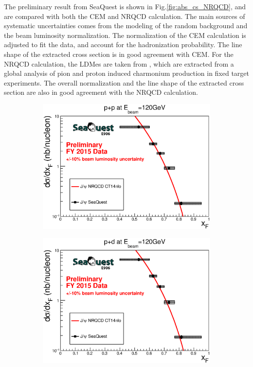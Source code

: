\documentclass[10pt, a4paper,final]{article}
\begin{document}
The preliminary result from SeaQuest is shown in Fig.\ref{fig:abs_cs_NRQCD},
and are compared with both the CEM and NRQCD calculation. The main sources
of systematic uncertainties comes from the modeling of the random background
and the beam luminosity normalization. The normalization of the CEM calculation is
adjusted to fit the data, and account for the hadronization probability. The line
shape of the extracted cross section is in good agreement with CEM. For the NRQCD
calculation, the LDMes are taken from \cite{hsieh2021}, which are extracted from
a global analysis of pion and proton induced charmonium production in fixed target
experiments. The overall normalization and the line shape of the extracted cross
section are also in good agreement with the NRQCD calculation.
\begin{figure}[htbp!]
	\centering
	\begin{subfigure}{0.45\linewidth}
		\includegraphics[width=0.9\linewidth]{jpsi_xF_LH2}
	\end{subfigure}
	\begin{subfigure}{0.45\linewidth}
		\includegraphics[width=0.9\linewidth]{jpsi_xF_LD2}

\end{subfigure}
\end{figure}
\end{document}
